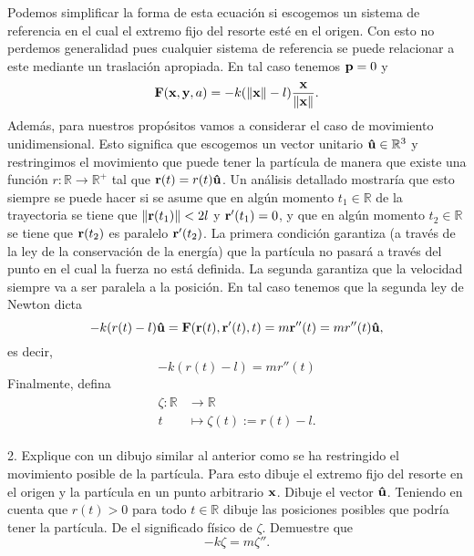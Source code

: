 \documentclass{article}
\begin{document}
Podemos simplificar la forma de esta ecuación si escogemos un sistema de referencia en el cual el extremo fijo del resorte esté en el origen. Con esto no perdemos generalidad pues cualquier sistema de referencia se puede relacionar a este mediante un traslación apropiada. En tal caso tenemos $\vb{p}=0$ y   
\begin{equation}
\vb{F}(\vb{x},\vb{y},a)=-k(\|\vb{x}\|-l)\frac{\vb{x}}{\|\vb{x}\|}.
\end{equation} 
Además, para nuestros propósitos vamos a considerar el caso de movimiento unidimensional. Esto significa que escogemos un vector unitario $\vu{u}\in\mathbb{R}^3$ y restringimos el movimiento que puede tener la partícula de manera que existe una función $r:\mathbb{R}\rightarrow\mathbb{R}^+$ tal que $\vb{r}(t)=r(t)\vu{u}$. Un análisis detallado mostraría que esto siempre se puede hacer si se asume que en algún momento $t_1\in\mathbb{R}$ de la trayectoria se tiene que $\|\vb{r}(t_1)\|<2l$ y $\vb{r}'(t_1)=0$, y que en algún momento $t_2\in\mathbb{R}$ se tiene que $\vb{r}(t_2)$ es paralelo $\vb{r}'(t_2)$. La primera condición garantiza (a través de la ley de la conservación de la energía) que la partícula no pasará a través del punto en el cual la fuerza no está definida. La segunda garantiza que la velocidad siempre va a ser paralela a la posición.  En tal caso tenemos que la segunda ley de Newton dicta
\begin{equation}
-k(r(t)-l)\vu{u}=\vb{F}(\vb{r}(t),\vb{r}'(t),t)=m\vb{r}''(t)=mr''(t)\vu{u},
\end{equation} 
es decir,
\begin{equation}
-k(r(t)-l)=mr''(t)
\end{equation}
Finalmente, defina
\begin{align}
\begin{split}
\zeta:\mathbb{R}&\rightarrow\mathbb{R}\\
t&\mapsto\zeta(t):=r(t)-l.
\end{split}
\end{align}

2. Explique con un dibujo similar al anterior como se ha restringido el movimiento posible de la partícula. Para esto dibuje el extremo fijo del resorte en el origen y la partícula en un punto arbitrario $\vb{x}$.  Dibuje el vector $\vu{u}$. Teniendo en cuenta que $r(t)>0$ para todo $t\in\mathbb{R}$ dibuje las posiciones posibles que podría tener la partícula. De el significado físico de $\zeta$. Demuestre que
\begin{equation}\label{ec:movimiento_armonico_simple}
-k\zeta=m\zeta''.
\end{equation}
\end{document}
